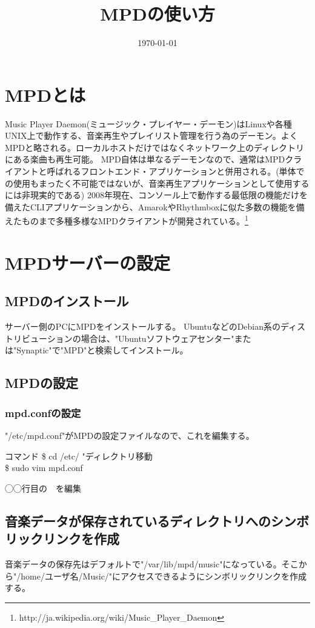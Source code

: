 \documentclass[11pt,a4paper]{jsarticle}
\title{MPDの使い方}
\date{\today}
\begin{document}
\maketitle
%
%
\section{MPDとは}
Music Player Daemon(ミュージック・プレイヤー・デーモン)はLinuxや各種UNIX上で動作する、音楽再生やプレイリスト管理を行う為のデーモン。よくMPDと略される。ローカルホストだけではなくネットワーク上のディレクトリにある楽曲も再生可能。
MPD自体は単なるデーモンなので、通常はMPDクライアントと呼ばれるフロントエンド・アプリケーションと併用される。(単体での使用もまったく不可能ではないが、音楽再生アプリケーションとして使用するには非現実的である)
2008年現在、コンソール上で動作する最低限の機能だけを備えたCLIアプリケーションから、AmarokやRhythmboxに似た多数の機能を備えたものまで多種多様なMPDクライアントが開発されている。\footnote{http://ja.wikipedia.org/wiki/Music\_Player\_Daemon}

\section{MPDサーバーの設定}
\subsection{MPDのインストール}
サーバー側のPCにMPDをインストールする。
UbuntuなどのDebian系のディストリビューションの場合は、"Ubuntuソフトウェアセンター"または"Synaptic"で"MPD"と検索してインストール。

\subsection{MPDの設定}

\subsubsection{mpd.confの設定}
"/etc/mpd.conf"がMPDの設定ファイルなので、これを編集する。

\begin{itembox}[l]{コマンド}
\$ cd /etc/ "ディレクトリ移動\\
\$ sudo vim mpd.conf
\end{itembox}

◯◯行目の~~を編集

\subsection{音楽データが保存されているディレクトリへのシンボリックリンクを作成}
音楽データの保存先はデフォルトで"/var/lib/mpd/music"になっている。そこから"/home/ユーザ名/Music/"にアクセスできるようにシンボリックリンクを作成する。
\end{document}
